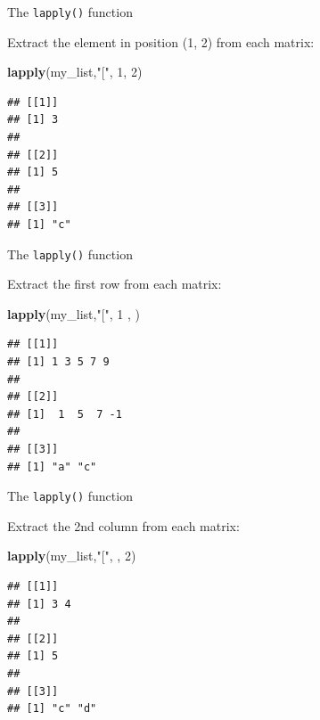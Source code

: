 \documentclass[ignorenonframetext,]{beamer}
\newenvironment{Shaded}{\begin{snugshade}}{\end{snugshade}}
\newcommand{\DecValTok}[1]{\textcolor[rgb]{0.00,0.00,0.81}{#1}}
\newcommand{\KeywordTok}[1]{\textcolor[rgb]{0.13,0.29,0.53}{\textbf{#1}}}
\newcommand{\NormalTok}[1]{#1}
\newcommand{\StringTok}[1]{\textcolor[rgb]{0.31,0.60,0.02}{#1}}
\begin{document}
\begin{frame}[fragile]{The \texttt{lapply()} function}
\protect\hypertarget{the-lapply-function-5}{}

Extract the element in position (1, 2) from each matrix:

\begin{Shaded}
\begin{Highlighting}[]
\KeywordTok{lapply}\NormalTok{(my_list,}\StringTok{"["}\NormalTok{, }\DecValTok{1}\NormalTok{, }\DecValTok{2}\NormalTok{)}
\end{Highlighting}
\end{Shaded}

\begin{verbatim}
## [[1]]
## [1] 3
## 
## [[2]]
## [1] 5
## 
## [[3]]
## [1] "c"
\end{verbatim}

\end{frame}

\begin{frame}[fragile]{The \texttt{lapply()} function}
\protect\hypertarget{the-lapply-function-6}{}

Extract the first row from each matrix:

\begin{Shaded}
\begin{Highlighting}[]
\KeywordTok{lapply}\NormalTok{(my_list,}\StringTok{"["}\NormalTok{, }\DecValTok{1}\NormalTok{ , )}
\end{Highlighting}
\end{Shaded}

\begin{verbatim}
## [[1]]
## [1] 1 3 5 7 9
## 
## [[2]]
## [1]  1  5  7 -1
## 
## [[3]]
## [1] "a" "c"
\end{verbatim}

\end{frame}

\begin{frame}[fragile]{The \texttt{lapply()} function}
\protect\hypertarget{the-lapply-function-7}{}

Extract the 2nd column from each matrix:

\begin{Shaded}
\begin{Highlighting}[]
\KeywordTok{lapply}\NormalTok{(my_list,}\StringTok{"["}\NormalTok{, , }\DecValTok{2}\NormalTok{)}
\end{Highlighting}
\end{Shaded}

\begin{verbatim}
## [[1]]
## [1] 3 4
## 
## [[2]]
## [1] 5
## 
## [[3]]
## [1] "c" "d"
\end{verbatim}

\end{frame}
\end{document}
